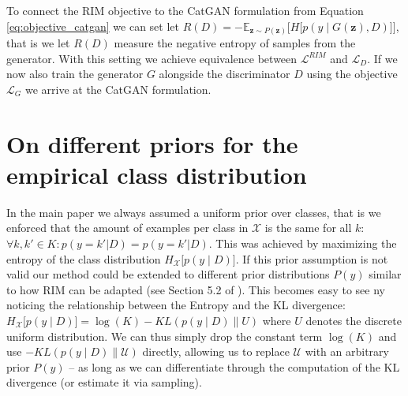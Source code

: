 \documentclass{article} \usepackage{iclr2016_conference,times}
\newcommand{\bz}{\mathbf{z}}
\begin{document}
\begin{appendix}
To connect the RIM objective to the CatGAN formulation from Equation
\eqref{eq:objective_catgan} we can set let
$R(D) = - \mathbb{E}_{\bz \sim P(\bz)} \Big[ H\big[ p(y \mid G(\bz),
D) \big] \Big]$,
that is we let $R(D)$ measure the negative entropy of samples from the
generator. With this setting we achieve equivalence between
$\mathcal{L}^{RIM}$ and $\mathcal{L}_{D}$. If we now also train the
generator $G$ alongside the discriminator $D$ using the objective
$\mathcal{L}_{G}$ we arrive at the CatGAN formulation.

\section{On different priors for the empirical class distribution}
In the main paper we always assumed a uniform prior over classes, that
is we enforced that the amount of examples per class in $\mathcal{X}$
is the same for all $k$:
$\forall k,k' \in K: p(y = k' | D) = p(y = k' | D)$. This was achieved
by maximizing the entropy of the class distribution
$H_{\mathcal{X}} \Big [ p( y \mid D ) \Big ]$. If this prior
assumption is not valid our method could be extended to different
prior distributions $P(y)$ similar to how RIM can be adapted (see
Section 5.2 of \citet{Krause_2010}). This becomes easy to see ny
noticing the relationship between the Entropy and the KL divergence:
$H_{\mathcal{X}} \Big [ p( y \mid D ) \Big ] = \log(K) - KL(p( y \mid
D ) \| U) $
where $U$ denotes the discrete uniform distribution. We can thus
simply drop the constant term $\log(K)$ and use
$- KL(p( y \mid D ) \| \mathcal{U})$ directly, allowing us to replace
$\mathcal{U}$ with an arbitrary prior $P(y)$ -- as long as we can
differentiate through the computation of the KL divergence (or
estimate it via sampling). 


\end{appendix}
\end{document}
